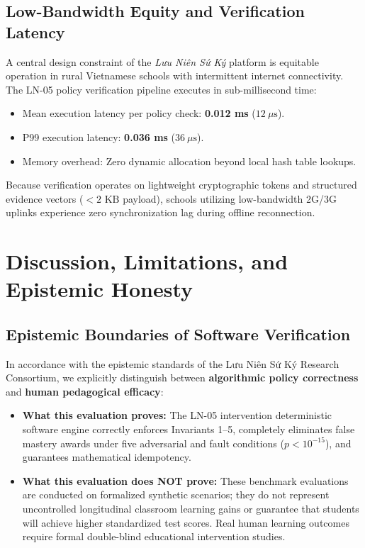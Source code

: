 \documentclass[11pt,a4paper]{article}
\begin{document}
\subsection{Low-Bandwidth Equity and Verification Latency}
A central design constraint of the \textit{Lưu Niên Sứ Ký} platform is equitable operation in rural Vietnamese schools with intermittent internet connectivity. The LN-05 policy verification pipeline executes in sub-millisecond time:
\begin{itemize}[leftmargin=*]
    \item Mean execution latency per policy check: \textbf{0.012 ms} ($12 \ \mu\text{s}$).
    \item P99 execution latency: \textbf{0.036 ms} ($36 \ \mu\text{s}$).
    \item Memory overhead: Zero dynamic allocation beyond local hash table lookups.
\end{itemize}
Because verification operates on lightweight cryptographic tokens and structured evidence vectors ($< 2 \text{ KB}$ payload), schools utilizing low-bandwidth 2G/3G uplinks experience zero synchronization lag during offline reconnection.

\section{Discussion, Limitations, and Epistemic Honesty}

\subsection{Epistemic Boundaries of Software Verification}
In accordance with the epistemic standards of the Lưu Niên Sứ Ký Research Consortium, we explicitly distinguish between \textbf{algorithmic policy correctness} and \textbf{human pedagogical efficacy}:
\begin{itemize}[leftmargin=*]
    \item \textbf{What this evaluation proves:} The LN-05 intervention deterministic software engine correctly enforces Invariants 1--5, completely eliminates false mastery awards under five adversarial and fault conditions ($p < 10^{-15}$), and guarantees mathematical idempotency.
    \item \textbf{What this evaluation does NOT prove:} These benchmark evaluations are conducted on formalized synthetic scenarios; they do not represent uncontrolled longitudinal classroom learning gains or guarantee that students will achieve higher standardized test scores. Real human learning outcomes require formal double-blind educational intervention studies.
\end{itemize}
\end{document}
